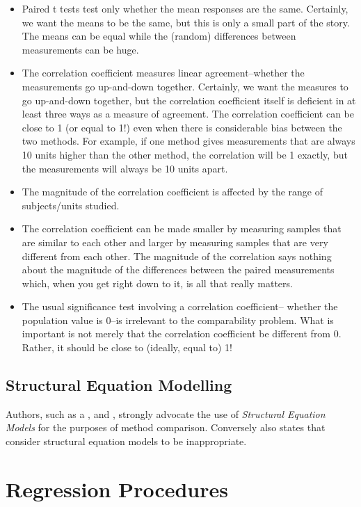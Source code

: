 \documentclass[12pt, a4paper]{report}
\theoremstyle{plain}
\theoremstyle{definition}
\theoremstyle{remark}
\begin{document}
	\begin{itemize}
		\item Paired t tests test only whether the mean responses are the same. Certainly, we want the means to be the same, but this is only a small part of the story. The means can be equal while the (random) differences between measurements can be huge.
		\item The correlation coefficient measures linear agreement--whether the measurements go up-and-down together. Certainly, we want the measures to go up-and-down together, but the correlation coefficient itself is deficient in at least three ways as a measure of agreement.
		The correlation coefficient can be close to 1 (or equal to 1!) even when there is considerable bias between the two methods. For example, if one method gives measurements that are always 10 units higher than the other method, the correlation will be 1 exactly, but the measurements will always be 10 units apart.
		\item The magnitude of the correlation coefficient is affected by the range of subjects/units studied. 
		\item The correlation coefficient can be made smaller by measuring samples that are similar to each other and larger by measuring samples that are very different from each other. The magnitude of the correlation says nothing about the magnitude of the differences between the paired measurements which, when you get right down to it, is all that really matters.
		\item The usual significance test involving a correlation coefficient-- whether the population value is 0--is irrelevant to the comparability problem. What is important is not merely that the correlation coefficient be different from 0. Rather, it should be close to (ideally, equal to) 1!
	\end{itemize}

	\section*{Structural Equation Modelling}
	Authors, such as a \citet{lewis}, \citet{dunnSEME} and \citet{voelkel2005center}, strongly advocate the use of \textit{Structural Equation Models} for the purposes of method comparison. Conversely \citet{BA99} also states that consider structural equation models to be inappropriate.
	


	\chapter{Regression Procedures}
\end{document}
